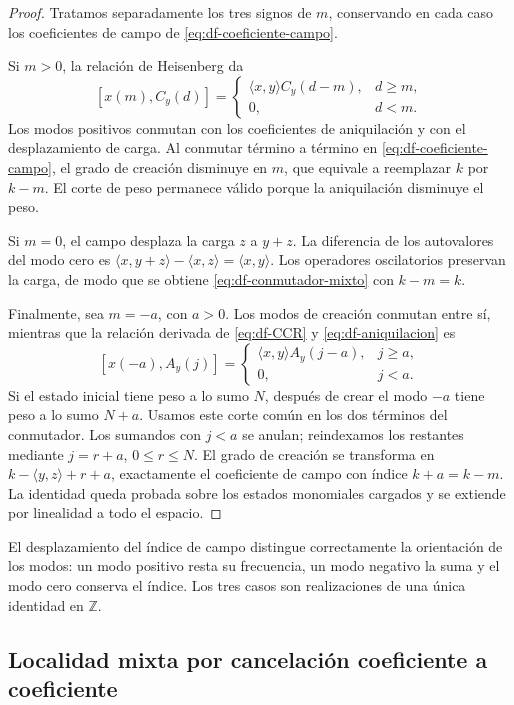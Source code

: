 \begin{proof}
Tratamos separadamente los tres signos de \(m\), conservando en cada
caso los coeficientes de campo de \eqref{eq:df-coeficiente-campo}.

Si \(m>0\), la relación de Heisenberg da
\[
 [x(m),C_y(d)]=
 \begin{cases}
 \langle x,y\rangle C_y(d-m),&d\geq m,\\
 0,&d<m.
 \end{cases}
\]
Los modos positivos conmutan con los coeficientes de aniquilación y
con el desplazamiento de carga. Al conmutar término a término en
\eqref{eq:df-coeficiente-campo}, el grado de creación disminuye en
\(m\), que equivale a reemplazar \(k\) por \(k-m\). El corte de peso
permanece válido porque la aniquilación disminuye el peso.

Si \(m=0\), el campo desplaza la carga \(z\) a \(y+z\). La diferencia
de los autovalores del modo cero es
\(\langle x,y+z\rangle-\langle x,z\rangle=\langle x,y\rangle\).
Los operadores oscilatorios preservan la carga, de modo que se obtiene
\eqref{eq:df-conmutador-mixto} con \(k-m=k\).

Finalmente, sea \(m=-a\), con \(a>0\). Los modos de creación conmutan
entre sí, mientras que la relación derivada de
\eqref{eq:df-CCR} y \eqref{eq:df-aniquilacion} es
\[
 [x(-a),A_y(j)]=
 \begin{cases}
 \langle x,y\rangle A_y(j-a),&j\geq a,\\
 0,&j<a.
 \end{cases}
\]
Si el estado inicial tiene peso a lo sumo \(N\), después de crear el
modo \(-a\) tiene peso a lo sumo \(N+a\). Usamos este corte común en
los dos términos del conmutador. Los sumandos con \(j<a\) se anulan;
reindexamos los restantes mediante \(j=r+a\), \(0\leq r\leq N\).
El grado de creación se transforma en
\(k-\langle y,z\rangle+r+a\), exactamente el coeficiente de campo
con índice \(k+a=k-m\). La identidad queda probada sobre los estados
monomiales cargados y se extiende por linealidad a todo el espacio.
\end{proof}

El desplazamiento del índice de campo distingue correctamente la
orientación de los modos: un modo positivo resta su frecuencia, un modo
negativo la suma y el modo cero conserva el índice. Los tres casos son
realizaciones de una única identidad en \(\mathbb Z\).

\subsection{Localidad mixta por cancelación coeficiente a coeficiente}
\label{subsec:df-localidad-mixta}

